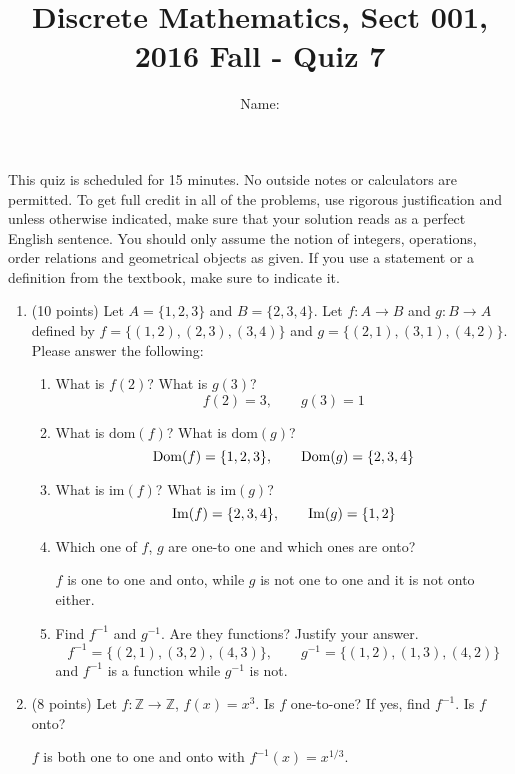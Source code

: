 \documentclass[11pt]{preprint}
\title{Discrete Mathematics, Sect 001, 2016 Fall - Quiz 7}
\author{Name:}
\institute{Courant Institute of Mathematical Sciences, NYU}
\begin{document}
\maketitle

This quiz is scheduled for 15 minutes. No outside notes or calculators are permitted. To get full credit  in all of the problems, use rigorous justification and unless otherwise indicated, make sure that your solution reads as a perfect English sentence. You should only assume the notion of integers, operations, order relations and geometrical objects as given. If you use a statement or a definition from the textbook, make sure to indicate it.
\vspace{0.2cm}

\begin{enumerate}
\item(10 points) Let $A=\{1,2,3\}$ and $B=\{2,3,4\}$. Let $f:A\to B$ and $g:B\to A$ defined by $f=\{(1,2),(2,3),(3,4)\}$ and $g=\{(2,1),(3,1),(4,2)\}$. Please answer the following:
\begin{enumerate}
\item What is $f(2)$? What is $g(3)$?
\[
f(2)=3,\qquad g(3)=1
\]
\item What is $\textrm{dom}(f)$? What is $\textrm{dom}(g)$?
\[
{\rm Dom}(f)=\{1,2,3\},\qquad {\rm Dom}(g)=\{2,3,4\}
\]
\item What is $\textrm{im}(f)$? What is $\textrm{im}(g)$?
\[
{\rm Im}(f)=\{2,3,4\},\qquad {\rm Im}(g)=\{1,2\}
\]
\item Which one of $f$, $g$ are one-to one and which ones are onto?

$f$ is one to one and onto, while $g$ is not one to one and it is not onto either.
\item Find $f^{-1}$ and $g^{-1}$. Are they functions? Justify your answer.
\[
f^{-1}=\{(2,1), (3,2),(4,3)\},\qquad g^{-1}=\{(1,2),(1,3),(4,2)\}
\]
and $f^{-1}$ is a function while $g^{-1}$ is not.
\end{enumerate}
\vspace{3cm}
\item (8 points)  Let $f:\mathbb{Z}\to\mathbb{Z}$, $f(x)=x^3$. Is $f$ one-to-one? If yes, find $f^{-1}$. Is $f$ onto? 

$f$ is both one to one and onto with $f^{-1}(x)=x^{1/3}$.
\end{enumerate}
\end{document}
